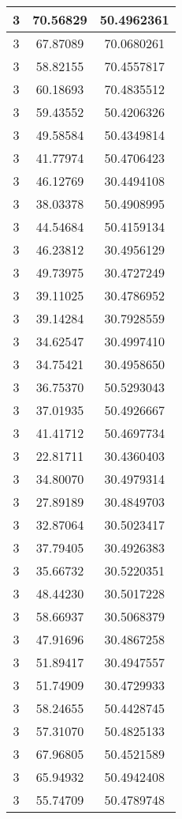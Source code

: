 \documentclass[
]{book}
\begin{document}
\begin{tabular}{c|c|c}
\hline
3 & 70.56829 & 50.4962361\\
\hline
3 & 67.87089 & 70.0680261\\
\hline
3 & 58.82155 & 70.4557817\\
\hline
3 & 60.18693 & 70.4835512\\
\hline
3 & 59.43552 & 50.4206326\\
\hline
3 & 49.58584 & 50.4349814\\
\hline
3 & 41.77974 & 50.4706423\\
\hline
3 & 46.12769 & 30.4494108\\
\hline
3 & 38.03378 & 50.4908995\\
\hline
3 & 44.54684 & 50.4159134\\
\hline
3 & 46.23812 & 30.4956129\\
\hline
3 & 49.73975 & 30.4727249\\
\hline
3 & 39.11025 & 30.4786952\\
\hline
3 & 39.14284 & 30.7928559\\
\hline
3 & 34.62547 & 30.4997410\\
\hline
3 & 34.75421 & 30.4958650\\
\hline
3 & 36.75370 & 50.5293043\\
\hline
3 & 37.01935 & 50.4926667\\
\hline
3 & 41.41712 & 50.4697734\\
\hline
3 & 22.81711 & 30.4360403\\
\hline
3 & 34.80070 & 30.4979314\\
\hline
3 & 27.89189 & 30.4849703\\
\hline
3 & 32.87064 & 30.5023417\\
\hline
3 & 37.79405 & 30.4926383\\
\hline
3 & 35.66732 & 30.5220351\\
\hline
3 & 48.44230 & 30.5017228\\
\hline
3 & 58.66937 & 30.5068379\\
\hline
3 & 47.91696 & 30.4867258\\
\hline
3 & 51.89417 & 30.4947557\\
\hline
3 & 51.74909 & 30.4729933\\
\hline
3 & 58.24655 & 50.4428745\\
\hline
3 & 57.31070 & 50.4825133\\
\hline
3 & 67.96805 & 50.4521589\\
\hline
3 & 65.94932 & 50.4942408\\
\hline
3 & 55.74709 & 50.4789748\\

\end{tabular}
\end{document}
